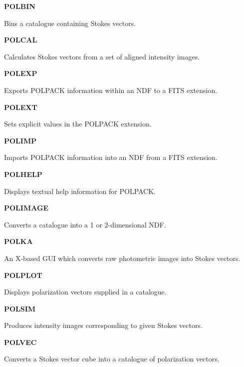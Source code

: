 \documentclass[twoside,11pt]{article}
\newenvironment{latexonly}{}{}
\renewcommand{\_}{\texttt{\symbol{95}}}
\newcommand{\quickdes}[3]{
                         \parbox{1.1in}{\bf #1}
                         \parbox{4.4in}{\raggedright #2 \dotfill}
                         \parbox{0.6in}{\pageref{#3}}
                         \vspace*{0.2in}}
\begin{document}
\newpage
\begin{latexonly}
\quickdes{POLBIN}{Bins a catalogue containing Stokes vectors.}{ POLBIN }

\quickdes{POLCAL}{Calculates Stokes vectors from a set of aligned intensity images.}{ POLCAL }

\quickdes{POLEXP}{Exports POLPACK information within an NDF to a FITS extension.}{ POLEXP }

\quickdes{POLEXT}{Sets explicit values in the POLPACK extension.}{ POLEXT }

\quickdes{POLIMP}{Imports POLPACK information into an NDF from a FITS extension.}{ POLEXP }

\quickdes{POLHELP}{Displays textual help information for POLPACK.}{ POLHELP }

\quickdes{POLIMAGE}{Converts a catalogue into a 1 or 2-dimensional NDF.}{ POLIMAGE }

\quickdes{POLKA}{An X-based GUI which converts raw photometric images into Stokes vectors.}{ POLKA }

\quickdes{POLPLOT}{Displays polarization vectors supplied in a catalogue.}{ POLPLOT }

\quickdes{POLSIM}{Produces intensity images corresponding to given Stokes vectors.}{ POLSIM }

\quickdes{POLVEC}{Converts a Stokes vector cube into a catalogue of polarization vectors.}{ POLVEC }
\end{latexonly}
\end{document}
